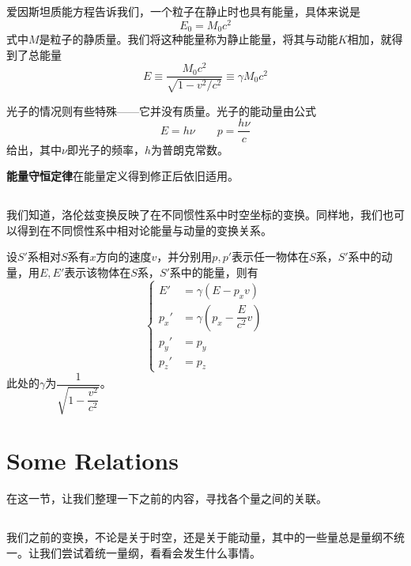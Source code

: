 爱因斯坦质能方程告诉我们，一个粒子在静止时也具有能量，具体来说是
\begin{equation}
    E_0=M_0c^2
\end{equation}
式中$M$是粒子的静质量。我们将这种能量称为静止能量，将其与动能$K$相加，就得到了总能量
\begin{equation}
    E\equiv \frac{M_0c^2}{\sqrt{1-v^2/c^2}}\equiv \gamma M_0 c^2
\end{equation}

光子的情况则有些特殊——它并没有质量。光子的能动量由公式
\begin{equation}
    E=h\nu\qquad p=\dfrac{h\nu}{c}
\end{equation}
给出，其中$\nu$即光子的频率，$h$为普朗克常数。

\textbf{能量守恒定律}在能量定义得到修正后依旧适用。
\subsection[不同惯性系中的转换]{}

我们知道，洛伦兹变换反映了在不同惯性系中时空坐标的变换。同样地，我们也可以得到在不同惯性系中相对论能量与动量的变换关系。
\begin{law}
    设$S'$系相对$S$系有$x$方向的速度$v$，并分别用$p,p'$表示任一物体在$S$系，$S'$系中的动量，用$E,E'$表示该物体在$S$系，$S'$系中的能量，则有
    \[\left\{\begin{aligned}
            E'   & =\gamma(E-p_xv)              \\
            p_x' & =\gamma(p_x-\dfrac{E}{c^2}v) \\
            p_y' & =p_y                         \\
            p_z' & =p_z
        \end{aligned}\right.\]
    此处的$\gamma$为$\dfrac{1}{\sqrt{1-\dfrac{v^2}{c^2}}}$。
\end{law}
\section[一些关联]{Some Relations}
在这一节，让我们整理一下之前的内容，寻找各个量之间的关联。
\subsection[量纲统一]{}
我们之前的变换，不论是关于时空，还是关于能动量，其中的一些量总是量纲不统一。让我们尝试着统一量纲，看看会发生什么事情。

